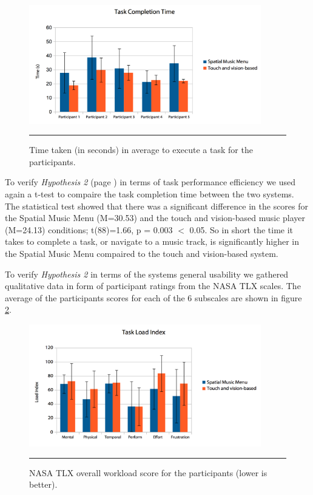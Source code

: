 \begin{figure}[h]
	\centering
		\includegraphics[width=0.9\textwidth,height=\textheight,keepaspectratio]{./Figures/results_tasktime.png}
		\rule{35em}{1pt}
	\caption[Results task time]{Time taken (in seconds) in average to execute a task for the participants.}
	\label{fig:resultstasktime}
\end{figure}

To verify \textit{Hypothesis 2} (page \pageref{sec:evaluationhypothesis}) in terms of task performance efficiency we used again a t-test to compaire the task completion time between the two systems. The statistical test showed that there was a significant difference in the scores for the Spatial Music Menu (M=30.53) and the touch and vision-based music player (M=24.13) conditions; t(88)=1.66, p = 0.003 $<$ 0.05. So in short the time it takes to complete a task, or navigate to a music track, is significantly higher in the Spatial Music Menu compaired to the touch and vision-based system.

To verify \textit{Hypothesis 2} in terms of the systems general usability we gathered qualitative data in form of participant ratings from the NASA TLX scales. The average of the participants scores for each of the 6 subscales are shown in figure \ref{fig:resultsnasatlx}.

\begin{figure}[h]
	\centering
		\includegraphics[width=0.9\textwidth,height=\textheight,keepaspectratio]{./Figures/results_taskloadindex.png}
		\rule{35em}{1pt}
	\caption[Results NASA TLX Score]{NASA TLX overall workload score for the participants (lower is better).}
	\label{fig:resultsnasatlx}
\end{figure}

